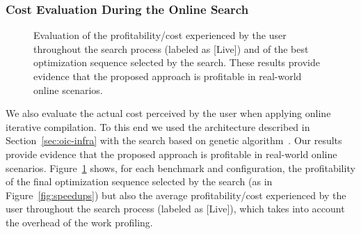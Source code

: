 \subsubsection{Cost Evaluation During the Online Search}

\begin{figure}[t]
  \centering
  \hfill
  \hfill
  \caption{Evaluation of the profitability/cost experienced by the user throughout the search process (labeled as [Live]) and of the best optimization sequence selected by the search. These results provide evidence that the proposed approach is profitable in real-world online scenarios.}
  \label{fig:deployment_cost}
\end{figure}

We also evaluate the actual cost perceived by the user when applying online iterative compilation.
To this end we used the architecture described in Section~\ref{sec:oic-infra} with the search based on genetic algorithm~\cite{knijnenburg02,kulkarni04}. %
Our results provide evidence that the proposed approach is profitable in real-world online scenarios.
Figure~\ref{fig:deployment_cost} shows, for each benchmark and configuration, the profitability of the final optimization sequence
selected by the search (as in Figure~\ref{fig:speedups}) but also the average profitability/cost experienced by the user throughout the search process (labeled as [Live]),
which takes into account the overhead of the work profiling.

